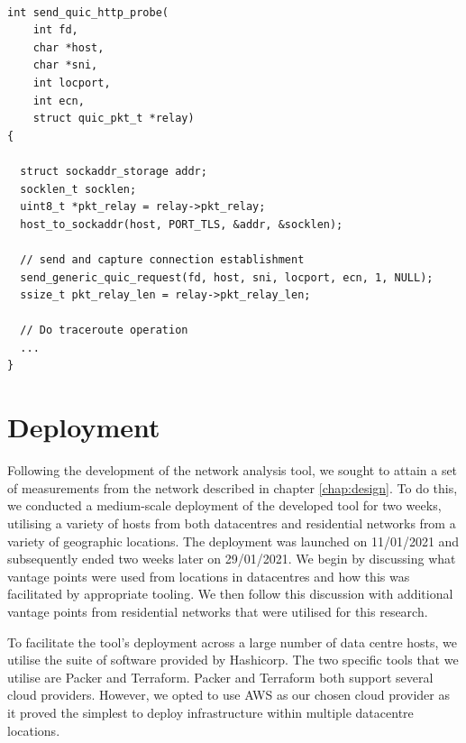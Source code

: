 \documentclass{l4proj}
\begin{document}
\begin{lstlisting}[caption={A demonstration of launching traceroutes under Quic, leveraging support from lsquic to generate a suitable connection establishment packet, which is then utilised under a standard traceroute operation. The use of synchronisation primitives and error checking have been removed for the sake of brevity.}, label={lst:quictrace}]

int send_quic_http_probe(
    int fd, 
    char *host, 
    char *sni, 
    int locport, 
    int ecn, 
    struct quic_pkt_t *relay)
{
  
  struct sockaddr_storage addr;
  socklen_t socklen;
  uint8_t *pkt_relay = relay->pkt_relay;
  host_to_sockaddr(host, PORT_TLS, &addr, &socklen);
  
  // send and capture connection establishment
  send_generic_quic_request(fd, host, sni, locport, ecn, 1, NULL);
  ssize_t pkt_relay_len = relay->pkt_relay_len;
  
  // Do traceroute operation
  ... 
}

\end{lstlisting}

\section{Deployment}

Following the development of the network analysis tool, we sought to attain a set of measurements from the network described in chapter \ref{chap:design}. To do this, we conducted a medium-scale deployment of the developed tool for two weeks, utilising a variety of hosts from both datacentres and residential networks from a variety of geographic locations. The deployment was launched on 11/01/2021 and subsequently ended two weeks later on 29/01/2021. We begin by discussing what vantage points were used from locations in datacentres and how this was facilitated by appropriate tooling. We then follow this discussion with additional vantage points from residential networks that were utilised for this research.

To facilitate the tool's deployment across a large number of data centre hosts, we utilise the suite of software provided by Hashicorp. The two specific tools that we utilise are Packer and Terraform. Packer and Terraform both support several cloud providers. However, we opted to use AWS as our chosen cloud provider as it proved the simplest to deploy infrastructure within multiple datacentre locations.
\end{document}
